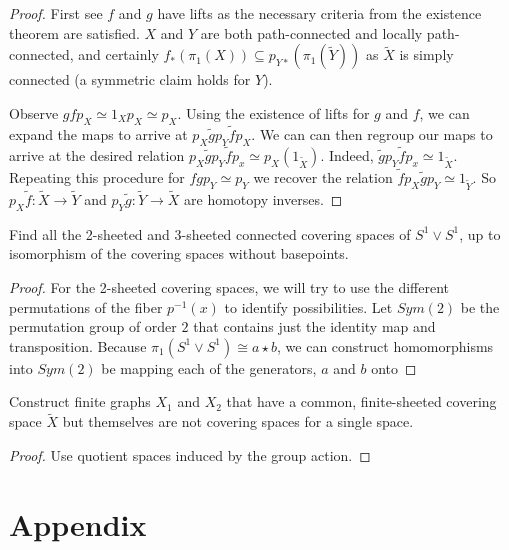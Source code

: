 \documentclass[10pt]{article}
\begin{document}
\begin{definition}
\begin{definition}
\begin{proof}
	First see $f$ and $g$ have lifts as the necessary criteria from the existence
	theorem are satisfied. $X$ and $Y$ are both path-connected and
	locally path-connected, and certainly $f_*(\pi_1(X)) \subseteq
	p_{Y*}(\pi_1(\tilde{Y}))$ as $\tilde{X}$ is simply connected (a symmetric
	claim holds for $Y$).

	Observe $gfp_X \simeq 1_Xp_X \simeq p_X$. Using the existence of lifts for $g$ and
	$f$, we can expand the maps to arrive at $p_X\tilde{g}p_Y\tilde{f}p_X$. We
	can can then regroup our maps to arrive at the desired relation
	$p_X\tilde{g}p_Y\tilde{f}p_x \simeq p_X(1_{\tilde{X}})$.  Indeed,
	$\tilde{g}p_Y\tilde{f}p_x \simeq 1_{\tilde{X}}$. Repeating this procedure for
	$fgp_Y \simeq p_Y$ we recover the relation $\tilde{f}p_X\tilde{g}p_Y \simeq
	1_{\tilde{Y}}$. So $p_X\tilde{f}: \tilde{X} \to \tilde{Y}$ and $p_Y\tilde{g}:
	\tilde{Y} \to \tilde{X}$ are homotopy inverses.
\end{proof}


\begin{exercise}
	Find all the 2-sheeted and 3-sheeted connected covering spaces of $S^1 \vee
	S^1$, up to isomorphism of the covering spaces without basepoints.
\end{exercise}

\begin{proof}
	For the 2-sheeted covering spaces, we will try to use the different
	permutations of the fiber $p^{-1}(x)$ to identify possibilities. Let $Sym(2)$
	be the permutation group of order $2$ that contains just the identity map and
	transposition. Because $\pi_1(S^1 \vee S^1) \cong a \star b$, we can
	construct homomorphisms into $Sym(2)$ be mapping each of the generators, $a$
	and $b$ onto 
	
\end{proof}

\begin{exercise}
	Construct finite graphs $X_1$ and $X_2$ that have a common, finite-sheeted
	covering space $\tilde{X}$ but themselves are not covering spaces for a
	single space.
\end{exercise}

\begin{proof}
	Use quotient spaces induced by the group action.
\end{proof}

\section{Appendix}


\end{definition}
\end{definition}
\end{document}
